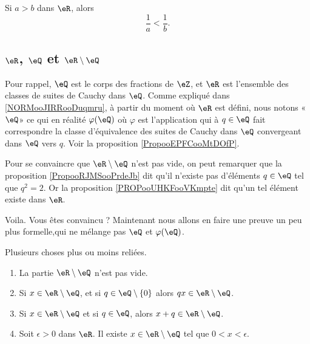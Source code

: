 \begin{proposition}		\label{PROPooVIDJooSzXPLP}
	Si \( a>b\) dans \( \eR\), alors
	\begin{equation}
		\frac{1}{ a}<\frac{1}{ b}.
	\end{equation}
\end{proposition}


\subsection{\( \eR\), \( \eQ\) et \( \eR\setminus \eQ\)}

\begin{normaltext}		\label{NORMooXRGFooPCujZI}
	Pour rappel, \( \eQ\)  est le corps des fractions de \( \eZ\), et \( \eR\) est l'ensemble des classes de suites de Cauchy dans \( \eQ\). Comme expliqué dans \ref{NORMooJIRRooDuqmru}, à partir du moment où \( \eR\) est défini, nous notons «\( \eQ\)» ce qui en réalité \( \varphi(\eQ)\) où \( \varphi\) est l'application qui à \( q\in \eQ\) fait correspondre la classe d'équivalence des suites de Cauchy dans \( \eQ\) convergeant dans \( \eQ\) vers \( q\). Voir la proposition \ref{PropooEPFCooMtDOfP}.
\end{normaltext}

\begin{normaltext}
	Pour se convaincre que \( \eR\setminus \eQ\) n'est pas vide, on peut remarquer que la proposition \ref{PropooRJMSooPrdeJb} dit qu'il n'existe pas d'éléments \( q\in \eQ\) tel que \( q^2=2\). Or la proposition \ref{PROPooUHKFooVKmpte} dit qu'un tel élément existe dans \( \eR\).

	Voila. Vous êtes convaincu ? Maintenant nous allons en faire une preuve un peu plus formelle,qui ne mélange pas \( \eQ\) et \( \varphi(\eQ)\).
\end{normaltext}

\begin{lemma}	\label{LEMooAYBFooHEUPZG}
	Plusieurs choses plus ou moins reliées.
	\begin{enumerate}
		\item		\label{ITEMooTHFAooVPPHCc}
		      La partie \( \eR\setminus \eQ\) n'est pas vide.
		\item		\label{ITEMooVXUOooOVByJv}
		      Si \( x\in \eR\setminus \eQ\), et si \( q\in \eQ\setminus\{ 0 \}\) alors \( qx\in \eR\setminus \eQ\).
		\item		\label{ITEMooHXTAooGBWeLL}
		      Si \( x\in \eR\setminus \eQ\) et si \( q\in \eQ\), alors \( x+q\in \eR\setminus \eQ\).
		\item		\label{ITEMooFOQRooRoftNW}
		      Soit \( \epsilon>0\) dans \( \eR\). Il existe \( x\in \eR\setminus\eQ\) tel que \( 0<x<\epsilon\).
	\end{enumerate}
\end{lemma}

